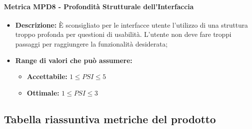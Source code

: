 \paragraph{Metrica MPD8 - Profondità Strutturale dell'Interfaccia}
\begin{itemize}
    \item \textbf{Descrizione:} È sconsigliato per le interfacce utente l'utilizzo di una struttura troppo profonda per questioni di usabilità. L'utente non deve fare troppi passaggi per raggiungere la funzionalità desiderata;
    \item \textbf{Range di valori che può assumere:}
    \begin{itemize}
        \item \textbf{Accettabile:} $1 \leq PSI \leq 5$
        \item \textbf{Ottimale:} $1 \leq PSI \leq 3$
    \end{itemize}
\end{itemize}

\subsection{Tabella riassuntiva metriche del prodotto}

